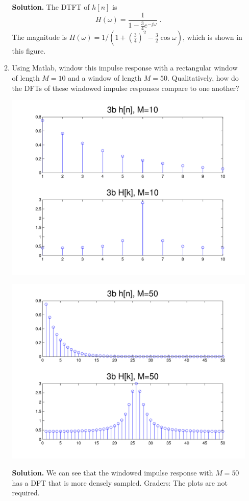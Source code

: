 \documentclass[]{siamltex}
\begin{document}
\begin{enumerate}
\begin{enumerate}
\vspace{5mm}
\textbf{Solution.} The DTFT of $h[n]$ is $$H(\omega) = \frac{1}{1-\frac{3}{4} e^{-j\omega}}\;.$$ The magnitude is $H(\omega) = 1/(1+ \left( \frac{3}{4}\right)^2- \frac{3}{2} \cos \omega)$, which is shown in this figure.




\vspace{3mm}
\item Using Matlab, window this impulse response with a rectangular window of length $M=10$ and a window of length $M=50$. Qualitatively, how do the DFTs of these windowed impulse responses compare to one another?

\includegraphics[width=.8\textwidth]{hw93b10-eps-converted-to.pdf} 
 
  \includegraphics[width=.8\textwidth]{hw93b50-eps-converted-to.pdf}


\textbf{Solution.} We can see that the windowed impulse response with $M=50$ has a DFT that is more densely sampled. Graders: The plots are not required.



\end{enumerate}
\end{enumerate}
\end{document}
